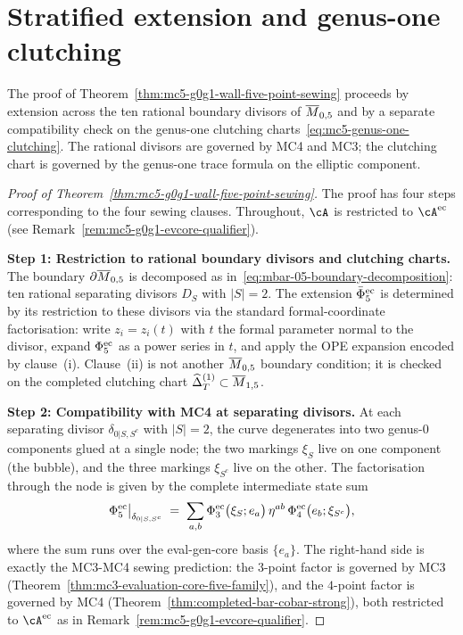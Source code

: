 \section{Stratified extension and genus-one clutching}
\label{sec:mc5-g0g1-stratified-extension}

The proof of Theorem~\ref{thm:mc5-g0g1-wall-five-point-sewing} proceeds
by extension across the ten rational boundary divisors of $\overline{M}_{0,5}$
and by a separate compatibility check on the genus-one clutching
charts~\eqref{eq:mc5-genus-one-clutching}. The rational divisors are
governed by MC4 and MC3; the clutching chart is governed by the
genus-one trace formula on the elliptic component.

\begin{proof}[Proof of Theorem~\ref{thm:mc5-g0g1-wall-five-point-sewing}]
The proof has four steps corresponding to the four sewing clauses.
Throughout, $\cA$ is restricted to $\cA^{\evcore}$
\textup{(}see Remark~\ref{rem:mc5-g0g1-evcore-qualifier}\textup{)}.

\medskip
\textbf{Step 1: Restriction to rational boundary divisors and clutching charts.}
The boundary $\partial \overline{M}_{0,5}$ is decomposed as
in~\eqref{eq:mbar-05-boundary-decomposition}: ten rational separating
divisors $D_S$ with $|S|=2$. The extension
$\bar\Phi^{\mathrm{ec}}_{5}$ is determined by its restriction to these
divisors via the standard formal-coordinate factorisation: write
$z_i=z_i(t)$ with $t$ the formal parameter normal to the divisor, expand
$\Phi^{\mathrm{ec}}_{5}$ as a power series in $t$, and apply the OPE
expansion encoded by clause~(i). Clause~(ii) is not another
$\overline{M}_{0,5}$ boundary condition; it is checked on the completed
clutching chart $\widehat{\Delta}^{(1)}_{T}\subset\overline{M}_{1,5}$.

\medskip
\textbf{Step 2: Compatibility with MC4 at separating divisors.}
At each separating divisor $\delta_{0|S, S^c}$ with $|S| = 2$, the
curve degenerates into two genus-$0$ components glued at a single node;
the two markings $\xi_{S}$ live on one component (the bubble), and the
three markings $\xi_{S^c}$ live on the other. The factorisation through
the node is given by the complete intermediate state sum
\begin{equation}
\label{eq:mc5-g0g1-mc4-intermediate-sum}
\Phi^{\mathrm{ec}}_{5}\big|_{\delta_{0|S, S^c}}
\;=\;
\sum_{a, b}
\Phi^{\mathrm{ec}}_{3}\bigl(\xi_{S}; e_{a}\bigr)
\,\eta^{ab}\,
\Phi^{\mathrm{ec}}_{4}\bigl(e_{b}; \xi_{S^c}\bigr),
\end{equation}
where the sum runs over the eval-gen-core basis $\{e_{a}\}$. The
right-hand side is exactly the MC3-MC4 sewing prediction: the
$3$-point factor is governed by MC3
\textup{(}Theorem~\ref{thm:mc3-evaluation-core-five-family}\textup{)}, and the $4$-point
factor is governed by MC4
\textup{(}Theorem~\ref{thm:completed-bar-cobar-strong}\textup{)},
both restricted to $\cA^{\evcore}$ as in
Remark~\ref{rem:mc5-g0g1-evcore-qualifier}.


\end{proof}
